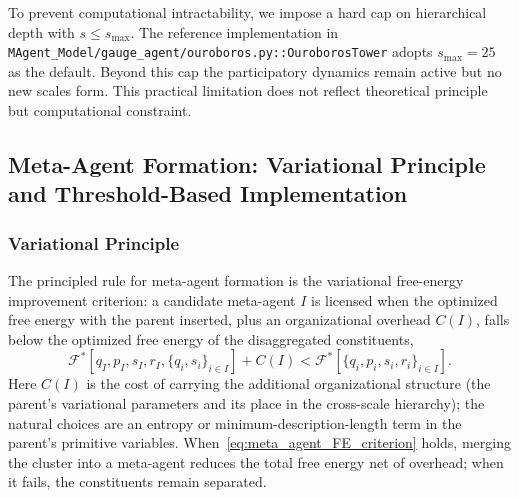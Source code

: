 \documentclass[11pt]{article}
\begin{document}
To prevent computational intractability, we impose a hard cap on hierarchical depth with $s \leq s_{\max}$. The reference implementation in \texttt{MAgent\_Model/gauge\_agent/ouroboros.py::OuroborosTower} adopts $s_{\max} = 25$ as the default. Beyond this cap the participatory dynamics remain active but no new scales form. This practical limitation does not reflect theoretical principle but computational constraint.

\subsection{Meta-Agent Formation: Variational Principle and Threshold-Based Implementation}
\label{sec:meta_agent_formation}

\subsubsection{Variational Principle}
\label{sec:meta_agent_variational}

The principled rule for meta-agent formation is the variational free-energy improvement criterion: a candidate meta-agent $I$ is licensed when the optimized free energy with the parent inserted, plus an organizational overhead $C(I)$, falls below the optimized free energy of the disaggregated constituents,
\begin{equation}
\mathcal{F}^*[q_I, p_I, s_I, r_I, \{q_i, s_i\}_{i \in I}] + C(I) < \mathcal{F}^*[\{q_i, p_i, s_i, r_i\}_{i \in I}].
\label{eq:meta_agent_FE_criterion}
\end{equation}
Here $C(I)$ is the cost of carrying the additional organizational structure (the parent's variational parameters and its place in the cross-scale hierarchy); the natural choices are an entropy or minimum-description-length term in the parent's primitive variables. When~\eqref{eq:meta_agent_FE_criterion} holds, merging the cluster into a meta-agent reduces the total free energy net of overhead; when it fails, the constituents remain separated.
\end{document}
